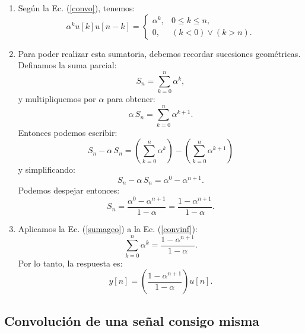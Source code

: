 \begin{enumerate}
	\item Según la Ec. (\ref{convo}), tenemos:
	\begin{equation}
		\alpha^{k} u[k] u[n-k] = \begin{cases}
			\alpha^k, & 0 \leq k \leq n, \\ 
			0, & (k < 0) \lor (k > n).
		\end{cases}
		\label{convinf}
	\end{equation}
	
	\item Para poder realizar esta sumatoria, debemos recordar sucesiones geométricas. Definamos la suma parcial:
	\begin{equation}
		S_{n} = \sum_{k=0}^n \alpha^k,
	\end{equation}
	y multipliquemos por $\alpha$ para obtener:
	\begin{equation}
		\alpha \, S_{n} = \sum_{k=0}^n \alpha^{k+1}.
	\end{equation}
	Entonces podemos escribir:
	\begin{equation}
		S_{n} - \alpha \, S_{n} = \left( \sum_{k=0}^n \alpha^k \right) - \left( \sum_{k=0}^n \alpha^{k+1} \right)
	\end{equation}
	y simplificando:
	\begin{equation}
		S_n - \alpha \, S_n = \alpha^0 - \alpha^{n+1}.
	\end{equation}
	Podemos despejar entonces:
	\begin{equation}
		S_n = \frac{\alpha^0 - \alpha^{n+1}}{1-\alpha} = \frac{1-\alpha^{n+1}}{1-\alpha}.
		\label{sumageo}
	\end{equation}
	
	\item Aplicamos la Ec. (\ref{sumageo}) a la Ec. (\ref{convinf}):
	\begin{equation}
		\sum_{k=0}^n \alpha^k = \frac{1-\alpha^{n+1}}{1-\alpha}.
		\label{sumaserie}
	\end{equation}
	Por lo tanto, la respuesta es:
	\begin{equation}
		y[n] = \left( \frac{1-\alpha^{n+1}}{1-\alpha} \right) u[n].
	\end{equation}
\end{enumerate}

\subsection{Convolución de una señal consigo misma}

